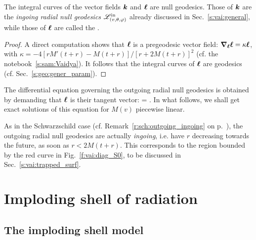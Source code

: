 \begin{greybox}
The integral curves of the vector fields $\bm{k}$ and $\bm{\ell}$ are null geodesics.
Those of $\bm{k}$ are the \emph{ingoing radial null geodesics}
$\mathscr{L}^{\rm in}_{(v,\theta,\varphi)}$ already discussed in Sec.~\ref{s:vai:general},
while those of $\bm{\ell}$ are called the .
\end{greybox}

\begin{proof}
A direct computation shows that $\bm{\ell}$ is a pregeodesic vector field:
$\bm{\nabla}_{\bm{\ell}} \bm{\ell} = \kappa \bm{\ell}$, with $\kappa = - 4 [rM'(t+r) - M(t+r)]/[r + 2M(t+r)]^2$
(cf. the notebook~\ref{s:sam:Vaidya}). It follows that the integral curves of
$\bm{\ell}$ are geodesics (cf. Sec.~\ref{s:geo:gener_param}).
\end{proof}
The differential equation governing the outgoing radial null geodesics
is obtained by demanding that $\bm{\ell}$ is their tangent vector:
\be \label{e:vai:ODE_outgoing_null}
     =  .
\ee
In what follows, we shall get exact solutions of this equation for $M(v)$ piecewise linear.

\begin{remark}
As in the Schwarzschild case (cf. Remark~\ref{r:sch:outgoing_ingoing}
on p.~\pageref{r:sch:outgoing_ingoing}),
the outgoing radial null geodesics are actually \emph{ingoing}, i.e. have $r$ decreasing towards the future,
as soon as $r < 2 M(t+r)$. This corresponds to the region bounded by the red curve in Fig.~\ref{f:vai:diag_S0}, to be discussed in Sec.~\ref{s:vai:trapped_surf}.
\end{remark}


\section{Imploding shell of radiation} \label{s:vai:infall}

\subsection{The imploding shell model} \label{s:vai:imploding_shell}

